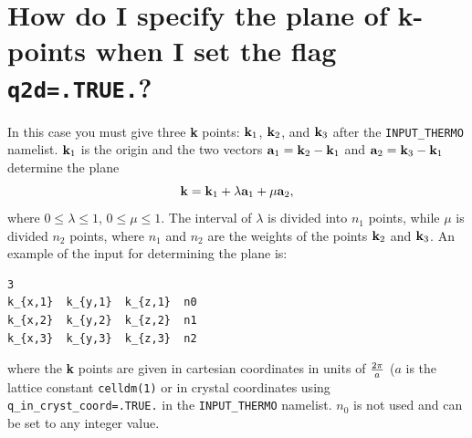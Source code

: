 \documentclass[12pt,a4paper,twoside]{report}
\begin{document}
\newpage
{\color{coral}\section{How do I specify the plane of {\bf k}-points 
when I set the flag \texttt{q2d=.TRUE.}?}}
\color{black}
In this case you must give three {\bf k} points: ${\bf k}_1$, 
${\bf k}_2$, and ${\bf k}_3$ after the \texttt{INPUT\_THERMO} 
namelist.
${\bf k}_1$ is the origin and the
two vectors ${\bf a}_1={\bf k}_2 - {\bf k}_1$ and ${\bf a}_2=
{\bf k}_3 - {\bf k}_1$ determine the plane
\begin{equation}
{\bf k} = {\bf k}_1 + \lambda {\bf a}_1 + \mu {\bf a}_2,
\end{equation}
where $0\le \lambda  \le 1$, $0\le \mu  \le 1$. The interval
of $\lambda$ is divided into $n_1$ points, while $\mu$ is divided
$n_2$ points, where $n_1$ and $n_2$ are the weights of the points
${\bf k}_2$ and ${\bf k}_3$.
An example of the input for determining the plane is:
\begin{verbatim}
3
k_{x,1}  k_{y,1}  k_{z,1}  n0
k_{x,2}  k_{y,2}  k_{z,2}  n1
k_{x,3}  k_{y,3}  k_{z,3}  n2
\end{verbatim}
where the {\bf k} points are given in cartesian coordinates in
units of $2\pi \over a$ ($a$ is the lattice constant \texttt{celldm(1)} 
or in crystal coordinates using \texttt{q\_in\_cryst\_coord=.TRUE.}
in the \texttt{INPUT\_THERMO} namelist.
$n_0$ is not used and can be set to any integer value.

\newpage
\end{document}

